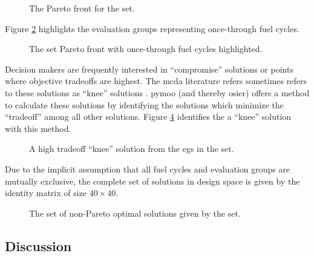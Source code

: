 \begin{figure}[ht!]
  \centering
  \resizebox{\columnwidth}{!}{}
  \caption{The Pareto front for the \ac{set}.}
  \label{fig:full-set-space}
\end{figure}

Figure \ref{fig:once-through-set-space} highlights the evaluation groups representing once-through
fuel cycles.

\begin{figure}[ht!]
  \centering
  \resizebox{\columnwidth}{!}{}
  \caption{The \ac{set} Pareto front with once-through fuel cycles highlighted.}
  \label{fig:once-through-set-space}
\end{figure}

Decision makers are frequently interested in ``compromise'' solutions or points where objective 
tradeoffs are highest. The \ac{mcda} literature refers sometimes refers to these solutions as ``knee''
solutions \cite{rachmawati_multiobjective_2009}. \ac{pymoo} (and thereby \ac{osier}) offers a method
to calculate these solutions by identifying the solutions which minimize the ``tradeoff'' among all
other solutions. Figure \ref{fig:single-eg-set-space} identifies the a ``knee'' solution with this method.

\begin{figure}[ht!]
  \centering
  \resizebox{\columnwidth}{!}{}
  \caption{A high tradeoff ``knee'' solution from the \acp{eg} in the \ac{set}.}
  \label{fig:single-eg-set-space}
\end{figure}

Due to the implicit assumption that all fuel cycles and evaluation groups are mutually exclusive,
the complete set of solutions in design space is given by the identity matrix of size $40 \times 40$.

\begin{figure}[ht!]
  \centering
  \resizebox{\columnwidth}{!}{}
  \caption{The set of non-Pareto optimal solutions given by the \ac{set}.}
  \label{fig:single-eg-set-space}
\end{figure}


\subsection{Discussion}

